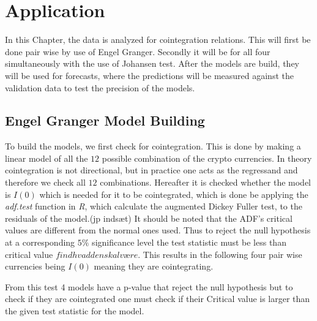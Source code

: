 \chapter{Application}
In this Chapter, the data is analyzed for cointegration relations. This will first be done pair wise by use of Engel Granger. Secondly it will be for all four simultaneously with the use of Johansen test. After the models are build, they will be used for forecasts, where the predictions will be measured against the validation data to test the precision of the models.


\section{Engel Granger Model Building}
To build the models, we first check for cointegration. This is done by making a linear model of all the $12$ possible combination of the crypto currencies. In theory cointegration is not directional, but in practice one acts as the regressand and therefore we check all $12$ combinations. Hereafter it is checked whether the model is $I(0)$ which is needed for it to be cointegrated, which is done be applying the \textit{adf.test} function in \textit{R}, which calculate the augmented Dickey Fuller test, to the residuals of the model.(jp indsæt) It should be noted that the ADF's critical values are different from the normal ones used. Thus to reject the null hypothesis at a corresponding $5\%$ significance level the test statistic must be less than critical value $find hvad den skal være$. This results in the following four pair wise currencies being $I(0)$ meaning they are cointegrating. 

From this test 4 models have a p-value that reject the null hypothesis but to check if they are cointegrated one must check if their Critical value is larger than the given test statistic for the model.













